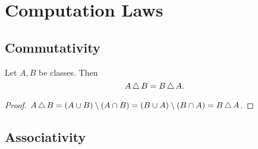\documentclass[10pt]{article}
\begin{document}
  \section{Computation Laws}

  \subsection{Commutativity}

  \begin{forthel}
    \begin{proposition}
      Let $A, B$ be classes.
      Then \[ A \mathop{\triangle} B = B \mathop{\triangle} A. \]
    \end{proposition}
    \begin{proof}
      $A \mathop{\triangle} B
        = (A \cup B) \setminus (A \cap B)
        = (B \cup A) \setminus (B \cap A)
        = B \mathop{\triangle} A$.
    \end{proof}
  \end{forthel}


  \subsection{Associativity}
\end{document}

